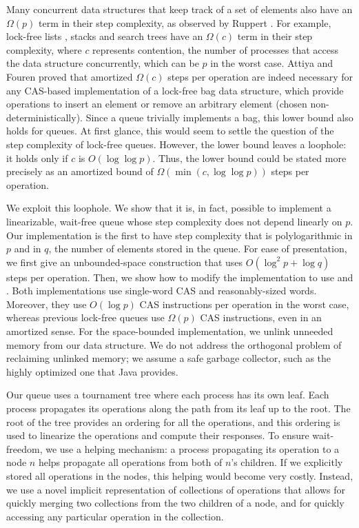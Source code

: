 Many concurrent data structures that keep track of a set of elements also have an $\Omega(p)$ term in their step complexity, as observed by Ruppert \cite{Rup16}.
For example, lock-free lists \cite{FR04,Sha15}, stacks \cite{Tre86} and search trees \cite{EFHR14} 
have an $\Omega(c)$ term in their step complexity, where $c$ represents contention,
the number of processes that access the data structure concurrently, which can be $p$ in the worst case.
Attiya and Fouren \cite{DBLP:conf/opodis/AttiyaF17} proved 
that amortized $\Omega(c)$ steps per operation are indeed necessary
for any CAS-based implementation of a lock-free bag data structure, which provide operations
to insert an element or remove an arbitrary element (chosen non-deterministically).
Since a queue trivially implements a bag, this lower bound also holds for queues.
At first glance, this would seem to settle the question of the step complexity of lock-free queues.
However, the lower bound leaves a loophole:  it holds only if $c$ is $O(\log\log p)$.
Thus, the lower bound could be stated more precisely as an amortized bound of $\Omega(\min(c,\log\log p))$ steps per operation.

We exploit this loophole.  We show that it is, in fact, possible to implement a linearizable, wait-free queue
whose step complexity does not depend linearly on $p$.
Our implementation is the first to have step complexity that is polylogarithmic in $p$ and in $q$, the number of elements
stored in the queue.
For ease of presentation, we first give an unbounded-space construction that uses
$O(\log^2 p + \log q)$ steps per operation.
Then, we show how to modify the implementation to use 
 and .
Both implementations use single-word CAS and reasonably-sized words.
Moreover, they use $O(\log p)$ CAS instructions per operation in the worst case, whereas previous
lock-free queues use 
$\Omega(p)$ CAS instructions, even in an amortized sense.
For the space-bounded implementation, we unlink unneeded memory from our data structure.
We do not address the orthogonal problem of reclaiming unlinked memory; we assume a safe
garbage collector, such as the highly optimized one that Java provides.

Our queue uses a tournament tree where each process has its own leaf.
Each process propagates its operations along the path from its leaf up to the root.
The root of the tree provides an ordering for all the operations,
and this ordering is used to linearize the operations and compute their responses.
To ensure wait-freedom, we use a helping mechanism:  a process propagating its operation 
to a node $n$ helps propagate all operations from both of $n$'s children.
If we explicitly stored all operations in the nodes, this helping would become very costly.
Instead, we use a novel implicit representation of collections
of operations that allows for quickly merging two collections from the two children of a node,
and for quickly accessing any particular operation in the collection.
